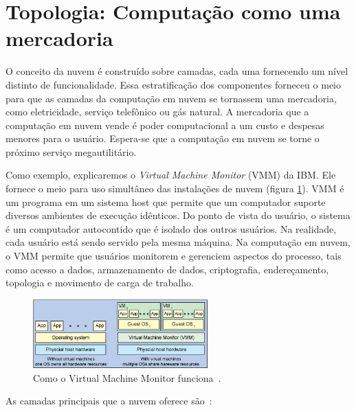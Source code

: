 \section{Topologia: Computação como uma mercadoria}

O conceito da nuvem é construído sobre camadas, cada uma fornecendo um nível
distinto de funcionalidade. Essa estratificação dos componentes forneceu o
meio para que as camadas da computação em nuvem se tornassem uma mercadoria, como
eletricidade, serviço telefônico ou gás natural. A mercadoria que a computação em
nuvem vende é poder computacional a um custo e despesas menores para o usuário.
Espera-se que a computação em nuvem se torne o próximo serviço megautilitário.

Como exemplo, explicaremos o \emph{Virtual Machine Monitor} (VMM) da IBM. Ele 
fornece o meio para uso simultâneo das instalações de nuvem (figura \ref{fig:vmm}). 
VMM é um programa em um sistema host que permite que um computador suporte diversos 
ambientes de execução idênticos. Do ponto de vista do usuário, o sistema é um 
computador autocontido que é isolado dos outros usuários. Na realidade, cada usuário 
está sendo servido pela mesma máquina. Na computação em nuvem, o VMM permite que 
usuários monitorem e gerenciem aspectos do processo, tais como acesso a dados, 
armazenamento de dados, criptografia, endereçamento, topologia e movimento de carga 
de trabalho. 


\begin{figure}[ht]
    \centering
    \includegraphics[width=0.6\textwidth]{img/vmm.png}
    \caption{Como o Virtual Machine Monitor
        funciona~\cite{cloud-computing-fundamentals}.
    } 
    \label{fig:vmm}
\end{figure}


As camadas principais que a nuvem oferece são~\cite{cloud-computing-fundamentals}:

\newcommand{\itemm}[1]{\item\textbf{#1}}

